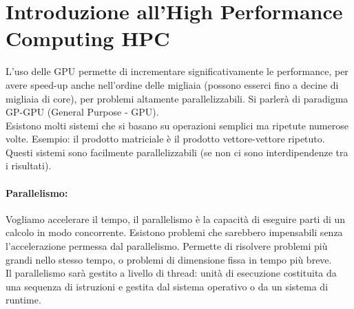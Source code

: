 
\section{Introduzione all'High Performance Computing HPC}


L'uso delle GPU permette di incrementare significativamente le performance, per avere speed-up anche nell'ordine delle migliaia (possono esserci fino a decine di migliaia di core), per problemi altamente parallelizzabili. Si parlerà di paradigma GP-GPU (General Purpose - GPU).\\
Esistono molti sistemi che si basano su operazioni semplici ma ripetute numerose volte. Esempio: il prodotto matriciale è il prodotto vettore-vettore ripetuto. Questi sistemi sono facilmente parallelizzabili (se non ci sono interdipendenze tra i risultati).\\

\paragraph{Parallelismo:} Vogliamo accelerare il tempo, il parallelismo è la capacità di eseguire parti di un calcolo in modo concorrente. Esistono problemi che sarebbero impensabili senza l'accelerazione permessa dal parallelismo. Permette di risolvere problemi più grandi nello stesso tempo, o problemi di dimensione fissa in tempo più breve.\\
Il parallelismo sarà gestito a livello di thread: unità di esecuzione costituita da una sequenza di istruzioni e gestita dal sistema operativo o da un sistema di runtime.\\

